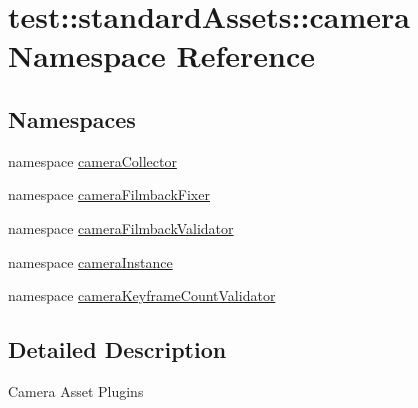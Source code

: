 \hypertarget{namespacetest_1_1standardAssets_1_1camera}{\section{test\-:\-:standard\-Assets\-:\-:camera \-Namespace \-Reference}
\label{d7/d60/namespacetest_1_1standardAssets_1_1camera}
}
\subsection*{\-Namespaces}
\begin{DoxyCompactItemize}
\item 
namespace \hyperlink{namespacetest_1_1standardAssets_1_1camera_1_1cameraCollector}{camera\-Collector}
\item 
namespace \hyperlink{namespacetest_1_1standardAssets_1_1camera_1_1cameraFilmbackFixer}{camera\-Filmback\-Fixer}
\item 
namespace \hyperlink{namespacetest_1_1standardAssets_1_1camera_1_1cameraFilmbackValidator}{camera\-Filmback\-Validator}
\item 
namespace \hyperlink{namespacetest_1_1standardAssets_1_1camera_1_1cameraInstance}{camera\-Instance}
\item 
namespace \hyperlink{namespacetest_1_1standardAssets_1_1camera_1_1cameraKeyframeCountValidator}{camera\-Keyframe\-Count\-Validator}
\end{DoxyCompactItemize}


\subsection{\-Detailed \-Description}
\begin{DoxyVerb}
Camera Asset Plugins
\end{DoxyVerb}
 
